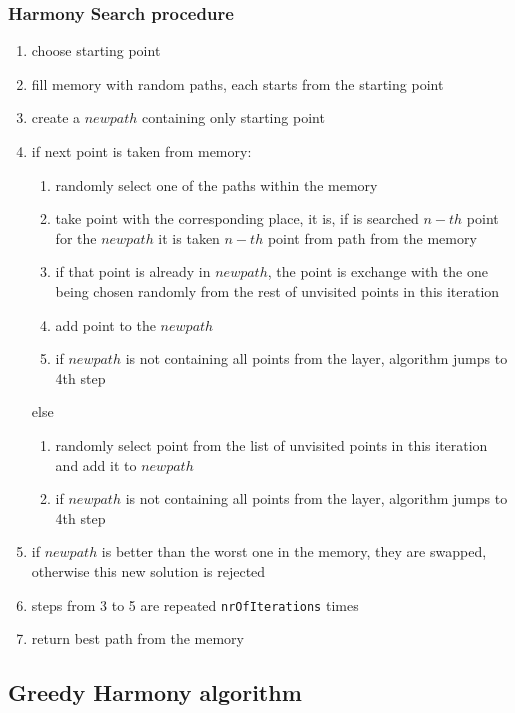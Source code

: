 \documentclass[titlepage]{article}
\begin{document}
\subsubsection{Harmony Search procedure}

\begin{enumerate}
	\item choose starting point
	\item fill memory with random paths, each starts from the starting point
	\item create a $new path$ containing only starting point
	\item if next point is taken from memory:
	\begin{enumerate}[label*=\arabic*.]
		\item randomly select one of the paths within the memory
		\item take point with the corresponding place, it is, if is searched $n-th$ point for the $new path$ it is taken $n-th$ point from path from the memory
		\item if that point is already in $new path$, the point is exchange with the one being chosen randomly from the rest of unvisited points in this iteration
		\item add point to the $new path$
		\item if $new path$ is not containing all points from the layer, algorithm jumps to 4th step
	\end{enumerate}
	else
	\begin{enumerate}[label*=\arabic*.]
		\item randomly select point from the list of unvisited points in this iteration and add it to $new path$
		\item if $new path$ is not containing all points from the layer, algorithm jumps to 4th step
	\end{enumerate}
	\item if $new path$ is better than the worst one in the memory, they are swapped, otherwise this new solution is rejected
	\item steps from 3 to 5 are repeated \texttt{nrOfIterations} times
	\item return best path from the memory
	
\end{enumerate}

\subsection{Greedy Harmony algorithm}
\end{document}
